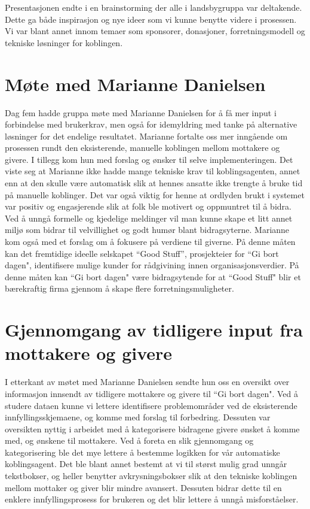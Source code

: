 Presentasjonen endte i en brainstorming der alle i landsbygruppa var deltakende. Dette ga både inspirasjon og nye ideer som vi kunne benytte videre i prosessen. Vi var blant annet innom temaer som sponsorer, donasjoner, forretningsmodell og tekniske løsninger for koblingen.

\section{Møte med Marianne Danielsen}
Dag fem hadde gruppa møte med Marianne Danielsen for å få mer input i forbindelse med brukerkrav, men også for idemyldring med tanke på alternative løsninger for det endelige resultatet. Marianne fortalte oss mer inngående om prosessen rundt den eksisterende, manuelle koblingen mellom mottakere og givere. I tillegg kom hun med forslag og ønsker til selve implementeringen. Det viste seg at Marianne ikke hadde mange tekniske krav til koblingsagenten, annet enn at den skulle være automatisk slik at hennes ansatte ikke trengte å bruke tid på manuelle koblinger. Det var også viktig for henne at ordlyden brukt i systemet var positiv og engasjerende slik at folk ble motivert og oppmuntret til å bidra. Ved å unngå formelle og kjedelige meldinger vil man kunne skape et litt annet miljø som bidrar til velvillighet og godt humør blant bidragsyterne. Marianne kom også med et forslag om å fokusere på verdiene til giverne. På denne måten kan det fremtidige ideelle selskapet “Good Stuff”, prosjekteier for ``Gi bort dagen", identifisere mulige kunder for rådgivining innen organisasjonsverdier. På denne måten kan ``Gi bort dagen" være bidragsytende for at ``Good Stuff" blir et bærekraftig firma gjennom å skape flere forretningsmuligheter.

\section{Gjennomgang av tidligere input fra mottakere og givere}
I etterkant av møtet med Marianne Danielsen sendte hun oss en oversikt over informasjon innsendt av tidligere mottakere og givere til ``Gi bort dagen". Ved å studere dataen kunne vi lettere identifisere problemområder ved de eksisterende innfyllingsskjemaene, og komme med forslag til forbedring. Dessuten var oversikten nyttig i arbeidet med å kategorisere bidragene givere ønsket å komme med, og ønskene til mottakere. Ved å foreta en slik gjennomgang og kategorisering ble det mye lettere å bestemme logikken for vår automatiske koblingsagent. Det ble blant annet bestemt at vi til størst mulig grad unngår tekstbokser, og heller benytter avkrysningsbokser slik at den tekniske koblingen mellom mottaker og giver blir mindre avansert. Dessuten bidrar dette til en enklere innfyllingsprosess for brukeren og det blir lettere å unngå misforståelser.

